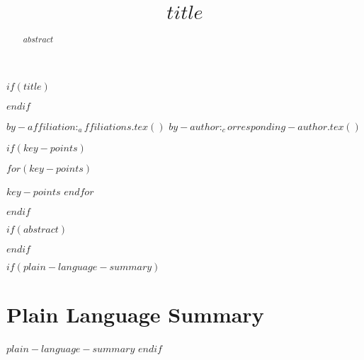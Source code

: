 $if(title)$
\title{$title$}
$endif$

$by-affiliation:_affiliations.tex()$
$by-author:_corresponding-author.tex()$

$if(key-points)$
\begin{keypoints}
$for(key-points)$\item $key-points$ $endfor$
\end{keypoints}
$endif$

$if(abstract)$
\begin{abstract}
$abstract$
\end{abstract}
$endif$

$if(plain-language-summary)$
\section*{Plain Language Summary}
$plain-language-summary$
$endif$



